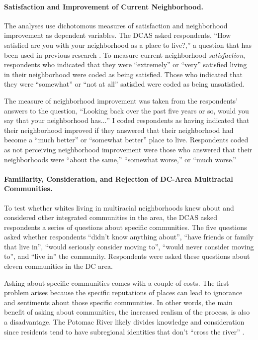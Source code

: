 \documentclass{baderart}
\begin{document}
\paragraph{Satisfaction and Improvement of Current Neighborhood.}
The analyses use dichotomous measures of satisfaction and neighborhood improvement as dependent variables. The DCAS asked respondents, ``How satisfied are you with your neighborhood as a place to live?,'' a question that has been used in previous research \citep[see, e.g.,][] {woldoff_effects_2002, greif_intersection_2015}. To measure current neighborhood \emph{satisfaction}, respondents who indicated that they were ``extremely'' or ``very'' satisfied living in their neighborhood were coded as being satisfied. Those who indicated that they were ``somewhat'' or ``not at all'' satisfied were coded as being unsatisfied.

The measure of neighborhood improvement was taken from the respondents' answers to the question, ``Looking back over the past five years or so, would you say that your neighborhood has\(\ldots\)'' I coded respondents as having indicated that their neighborhood improved if they answered that their neighborhood had become a ``much better'' or ``somewhat better'' place to live. Respondents coded as not perceiving neighborhood improvement were those who answered that their neighborhoods were ``about the same,'' ``somewhat worse,'' or ``much worse.''

\paragraph{Familiarity, Consideration, and Rejection of DC-Area Multiracial Communities.}

To test whether whites living in multiracial neighborhoods knew about and considered other integrated communities in the area, the DCAS asked respondents a series of questions about specific communities. The five questions asked whether respondents ``didn't know anything about'', ``have friends or family that live in'', ``would seriously consider moving to'', ``would never consider moving to'', and ``live in'' the community. Respondents were asked these questions about eleven communities in the DC area.

Asking about specific communities comes with a couple of costs. The first problem arises because the specific reputations of places can lead to ignorance and sentiments about those specific communities. In other words, the main benefit of asking about communities, the increased realism of the process, is also a disadvantage. The Potomac River likely divides knowledge and consideration since residents tend to have subregional identities that don't ``cross the river'' \citep{lacy_blue-chip_2007}.
\end{document}
